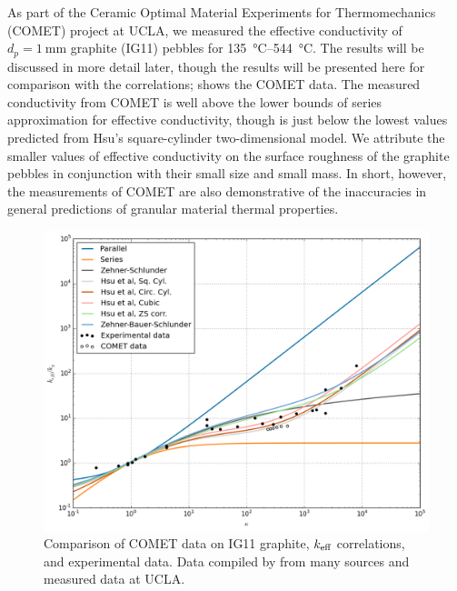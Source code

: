 As part of the Ceramic Optimal Material Experiments for Thermomechanics (COMET) project at UCLA, we measured the effective conductivity of $d_p = \SI{1}{\milli\meter}$ graphite (IG11) pebbles for \SIrange{135}{544}{\celsius}. The results will be discussed in more detail later, though the results will be presented here for comparison with the correlations;  shows the COMET data. The measured conductivity from COMET is well above the lower bounds of series approximation for effective conductivity, though is just below the lowest values predicted from Hsu\etal's square-cylinder two-dimensional model. We attribute the smaller values of effective conductivity on the surface roughness of the graphite pebbles in conjunction with their small size and small mass. In short, however, the measurements of COMET are also demonstrative of the inaccuracies in general predictions of granular material thermal properties.

\begin{figure}[ht]
    \centering
    \includegraphics[width=\textwidth]{figures/keff-kappa-experimental-comet}
    \caption{Comparison of COMET data on IG11 graphite, $k_\text{eff}$ correlations, and experimental data. Data compiled by \cite{VanAntwerpen2010} from many sources and measured data at UCLA.}
    \label{fig:kappa-experimental-comet}
\end{figure}












